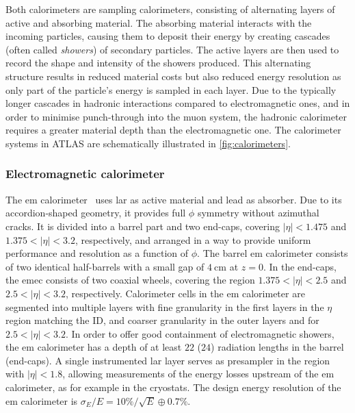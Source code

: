 Both calorimeters are sampling calorimeters, consisting of alternating layers of active and absorbing material.
The absorbing material interacts with the incoming particles, causing them to deposit their energy by creating cascades (often called \textit{showers}) of secondary particles.
The active layers are then used to record the shape and intensity of the showers produced.
This alternating structure results in reduced material costs but also reduced energy resolution as only part of the particle's energy is sampled in each layer.
Due to the typically longer cascades in hadronic interactions compared to electromagnetic ones, and in order to minimise punch-through into the muon system, the hadronic calorimeter requires a greater material depth than the electromagnetic one.
The calorimeter systems in ATLAS are schematically illustrated in \cref{fig:calorimeters}.

\subsubsection{Electromagnetic calorimeter}

The \gls{em} calorimeter~\cite{Aad:2008zzm} uses \gls{lar} as active material and lead as absorber.
Due to its accordion-shaped geometry, it provides full $\phi$ symmetry without azimuthal cracks.
It is divided into a barrel part and two end-caps, covering $\vert\eta\vert <1.475$ and $1.375 < \vert\eta\vert <3.2$, respectively, and arranged in a way to provide uniform performance and resolution as a function of $\phi$.
The barrel \gls{em} calorimeter consists of two identical half-barrels with a small gap of $\SI{4}{\centi\meter}$ at $z=0$. In the end-caps, the \gls{emec} consists of two coaxial wheels, covering the region $1.375 < \vert\eta\vert <2.5$ and $2.5 < \vert\eta\vert <3.2$, respectively.
Calorimeter cells in the \gls{em} calorimeter are segmented into multiple layers with fine granularity in the first layers in the $\eta$ region matching the ID, and coarser granularity in the outer layers and for $2.5 < \vert\eta\vert <3.2$.
In order to offer good containment of electromagnetic showers, the \gls{em} calorimeter has a depth of at least $22$ ($24$) radiation lengths in the barrel (end-caps).
A single instrumented \gls{lar} layer serves as presampler in the region with $\vert\eta\vert <1.8$, allowing measurements of the energy losses upstream of the \gls{em} calorimeter, as for example in the cryostats.
The design energy resolution of the \gls{em} calorimeter is $\sigma_E / E = 10\% / \sqrt{E} \oplus 0.7\%$.

